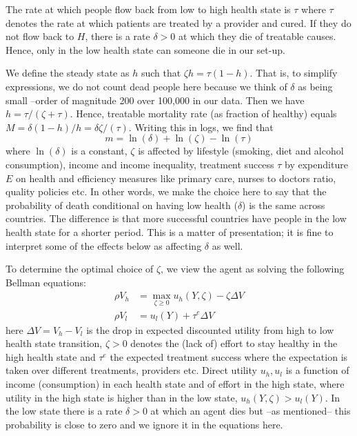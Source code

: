 \documentclass{article}
\begin{document}
The rate at which people flow back from low to high health state is \(\tau\) where \(\tau\) denotes the rate at which patients are treated by a provider and cured. If they do not flow back to \(H\), there is a rate \(\delta > 0\) at which they die of treatable causes. Hence, only in the low health state can someone die in our set-up.

We define the steady state as \(h\) such that \(\zeta h = \tau (1-h)\). That is, to simplify expressions, we do not count dead people here because we think of \(\delta\) as being small --order of magnitude 200 over 100,000 in our data. Then we have \(h =\tau/(\zeta+\tau)\). Hence, treatable mortality rate (as fraction of healthy) equals \(M = \delta (1-h)/h = \delta \zeta/(\tau)\). Writing this in logs, we find that
\begin{equation}
\label{eq:1}
m = \ln(\delta) + \ln(\zeta) - \ln(\tau)
\end{equation}
where \(\ln(\delta)\) is a constant, \(\zeta\) is affected by lifestyle (smoking, diet and alcohol consumption), income and income inequality, treatment success \(\tau\) by expenditure \(E\) on health and efficiency measures like primary care, nurses to doctors ratio, quality policies etc. In other words, we make the choice here to say that the probability of death conditional on having low health (\(\delta\)) is the same across countries. The difference is that more successful countries have people in the low health state for a shorter period. This is a matter of presentation; it is fine to interpret some of the effects below as affecting \(\delta\) as well.

To determine the optimal choice of \(\zeta\), we view the agent as solving the following Bellman equations:
\begin{align}
\label{eq:4}
\rho V_h &= \max_{\zeta \geq 0} u_h(Y,\zeta) - \zeta \Delta V \\
\label{eq:4b}
\rho V_l &= u_l(Y) + \tau^{e} \Delta V
\end{align}
here \(\Delta V = V_h - V_l\) is the drop in expected discounted utility from high to low health state transition, \(\zeta>0\) denotes the (lack of) effort to stay healthy in the high health state and \(\tau^e\) the expected treatment success where the expectation is taken over different treatments, providers etc. Direct utility \(u_h,u_l\) is a function of income (consumption) in each health state and of effort in the high state, where utility in the high state is higher than in the low state, \(u_h(Y,\zeta) > u_l(Y)\). In the low state there is a rate \(\delta > 0\) at which an agent dies but --as mentioned-- this probability is close to zero and we ignore it in the equations here.  
\end{document}
